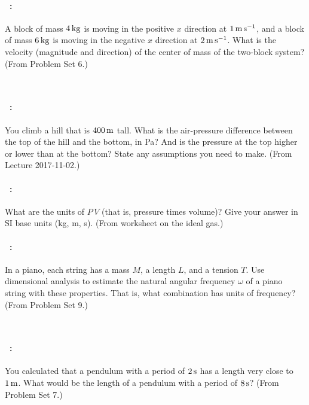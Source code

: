 \documentclass[12pt]{article} 
\begin{document}
\vfill

\paragraph{\problemname~\theproblem:}%
A block of mass $4\,\mathrm{kg}$ is moving in the positive $x$ direction at
$1\,\mathrm{m}\,\mathrm{s}^{-1}$, and a block of mass $6\,\mathrm{kg}$ is moving in the negative $x$ direction
at $2\,\mathrm{m}\,\mathrm{s}^{-1}$. What is the velocity (magnitude and direction) of the
center of mass of the two-block system?
(From Problem Set 6.)

\vfill
~
\clearpage

\paragraph{\problemname~\theproblem:}%
You climb a hill that is $400\,\mathrm{m}$ tall. What is the air-pressure
difference between the top of the hill and the bottom, in Pa? And is
the pressure at the top higher or lower than at the bottom? State
any assumptions you need to make.
(From Lecture 2017-11-02.)

\vfill

\paragraph{\problemname~\theproblem:}%
What are the units of $P\,V$ (that is, pressure times volume)?
Give your answer in SI base units (kg, m, s).
(From worksheet on the ideal gas.)

\vfill

\paragraph{\problemname~\theproblem:}%
In a piano, each string has a mass $M$, a length $L$, and a tension $T$.
Use dimensional analysis to estimate the natural angular
frequency $\omega$ of a piano string with these properties. That is,
what combination has units of frequency?
(From Problem Set 9.)

\vfill
~
\clearpage

\paragraph{\problemname~\theproblem:}%
You calculated that a pendulum with a period of $2\,\mathrm{s}$ has a length
very close to $1\,\mathrm{m}$. What would be the length of a pendulum with
a period of $8\,\mathrm{s}$?
(From Problem Set 7.)
\end{document}
